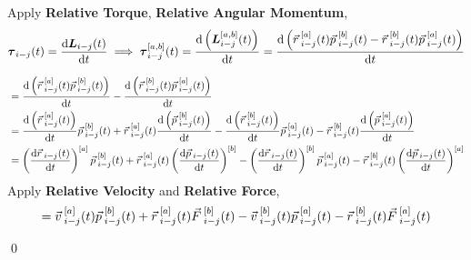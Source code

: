 \documentclass[12pt]{amsart}
\renewenvironment{proof}{{\bfseries Proof.}}{\qed}
\let\oldvec\vec
\renewcommand{\vec}[1]{\oldvec{#1}\hspace{0.1em}}
\begin{document}
\begin{proof}

Apply \textbf{Relative Torque}, \textbf{Relative Angular Momentum},
$$ \boldsymbol{\tau}_{i-j} (t) = \dfrac{\mathrm{d} \boldsymbol{L}_{i-j}(t)}{\mathrm{d} t} \implies \boldsymbol{\tau}^{[a,b]}_{i-j} (t) = \dfrac{\mathrm{d} \left ( \boldsymbol{L}^{[a,b]}_{i-j} (t) \right )}{\mathrm{d} t} = \dfrac{\mathrm{d} \left (\vec{r}^{[a]}_{i-j} (t) \vec{p}^{[b]}_{i-j} (t) - \vec{r}^{[b]}_{i-j} (t) \vec{p}^{[a]}_{i-j} (t) \right )}{\mathrm{d} t} $$
    
\begin{align*} &= \dfrac{\mathrm{d} \left ( \vec{r}^{[a]}_{i-j} (t) \vec{p}^{[b]}_{i-j} (t) \right )}{\mathrm{d} t} - \dfrac{\mathrm{d} \left ( \vec{r}^{[b]}_{i-j} (t) \vec{p}^{[a]}_{i-j} (t) \right )}{\mathrm{d} t} \\
&= \dfrac{\mathrm{d} \left ( \vec{r}^{[a]}_{i-j} (t) \right )}{\mathrm{d} t} \vec{p}^{[b]}_{i-j} (t) + \vec{r}^{[a]}_{i-j} (t) \dfrac{\mathrm{d} \left ( \vec{p}^{[b]}_{i-j} (t) \right )}{\mathrm{d} t} - \dfrac{\mathrm{d} \left ( \vec{r}^{[b]}_{i-j} (t) \right ) }{\mathrm{d} t} \vec{p}^{[a]}_{i-j} (t) - \vec{r}^{[b]}_{i-j} (t) \dfrac{\mathrm{d} \left ( \vec{p}^{[a]}_{i-j} (t) \right ) }{\mathrm{d} t} \\
&= \left ( \dfrac{\mathrm{d}  \vec{r}_{i-j} (t)}{\mathrm{d} t} \right ) ^{[a]} \vec{p}^{[b]}_{i-j} (t) + \vec{r}^{[a]}_{i-j} (t) \left (  \dfrac{\mathrm{d} \vec{p}_{i-j} (t)}{\mathrm{d} t} \right )^{[b]} - \left (\dfrac{\mathrm{d}  \vec{r}_{i-j} (t) }{\mathrm{d} t}\right ) ^{[b]} \vec{p}^{[a]}_{i-j} (t) - \vec{r}^{[b]}_{i-j} (t) \left ( \dfrac{\mathrm{d}  \vec{p}_{i-j} (t) }{\mathrm{d} t}  \right )^{[a]}
\end{align*}
Apply \textbf{Relative Velocity} and \textbf{Relative Force}, 
$$= \vec{v}_{i-j} ^{[a]} (t) \vec{p}^{[b]}_{i-j} (t) + \vec{r}^{[a]}_{i-j} (t) \vec{F}_{i-j}^{[b]} (t) - \vec{v}_{i-j} ^{[b]} (t) \vec{p}^{[a]}_{i-j} (t) - \vec{r}^{[b]}_{i-j} (t) \vec{F}_{i-j}^{[a]} (t)$$


\end{proof}
\end{document}
